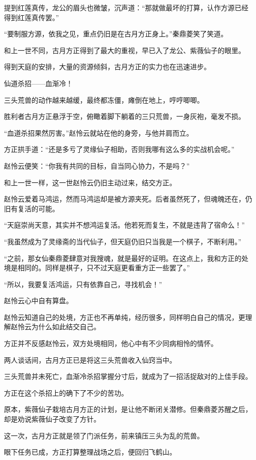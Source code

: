 \begin{this_body}
提到红莲真传，龙公的眉头也微皱，沉声道：“那就做最坏的打算，认作方源已经得到红莲真传罢。”

“要制服方源，依我之见，重点仍旧是在古月方正身上。”秦鼎菱笑了笑道。

和上一世不同，古月方正得到了最大的重视，早已入了龙公、紫薇仙子的眼里。

得到天庭的安排，大量的资源倾斜，古月方正的实力也在迅速进步。

仙道杀招——血渐冷！

三头荒兽的动作越来越缓，最终都冻僵，瘫倒在地上，哼哼唧唧。

胜利者古月方正悬浮于空，俯瞰着脚下躺着的三只荒兽，一身灰袍，毫发不损。

“血道杀招果然厉害。”赵怜云就站在他的身旁，与他并肩而立。

方正拱手道：“还是多亏了灵缘仙子相助，否则我哪有这么多的实战机会呢。”

赵怜云便笑：“你我有共同的目标，自当同心协力，不是吗？”

和上一世一样，这一世赵怜云仍旧主动过来，结交方正。

赵怜云爱着马鸿运，然而马鸿运却是被方源夹死。后者虽然死了，但魂魄还在，仍旧有复活的可能。

“天庭崇尚天意，其实并不想鸿运复活。他若死而复生，不就是违背了宿命么！”

“我虽然成为了灵缘斋的当代仙子，但天庭仍旧只当我是一个棋子，不断利用。”

“之前，那女仙秦鼎菱肆意对我搜魂，就是最好的证明。在这点上，我和方正的处境是相同的。同样是棋子，只不过天庭更看重方正一些罢了。”

“所以，我要复活鸿运，只有依靠自己，寻找机会！”

赵怜云心中自有算盘。

赵怜云知道自己的处境，方正也不再单纯，经历很多，同样明白自己的情况，更理解赵怜云为什么如此结交自己。

方正并不反感赵怜云，双方处境相同，他心中有不少同病相怜的情怀。

两人谈话间，古月方正已是将这三头荒兽收入仙窍当中。

三头荒兽并未死亡，血渐冷杀招掌握分寸后，就成为了一招活捉敌对的上佳手段。

方正在这个杀招上的确下了不少的苦功。

原本，紫薇仙子栽培古月方正的计划，是让他不断闭关潜修。但秦鼎菱苏醒之后，却是劝说紫薇仙子改变了方针。

这一次，古月方正就是领了门派任务，前来镇压三头为乱的荒兽。

眼下任务已成，方正打算整理战场之后，便回归飞鹤山。


\end{this_body}
